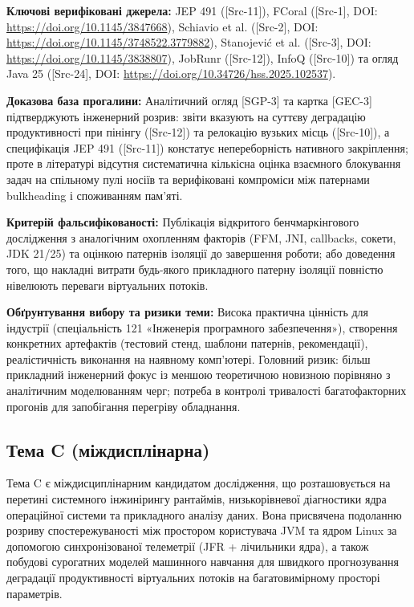 \textbf{Ключові верифіковані джерела:} JEP 491 ([Src-11]), FCoral ([Src-1], DOI: \url{https://doi.org/10.1145/3847668}), Schiavio et al. ([Src-2], DOI: \url{https://doi.org/10.1145/3748522.3779882}), Stanojević et al. ([Src-3], DOI: \url{https://doi.org/10.1145/3838807}), JobRunr ([Src-12]), InfoQ ([Src-10]) та огляд Java 25 ([Src-24], DOI: \url{https://doi.org/10.34726/hss.2025.102537}).

\textbf{Доказова база прогалини:} Аналітичний огляд [SGP-3] та картка [GEC-3] підтверджують інженерний розрив: звіти вказують на суттєву деградацію продуктивності при пінінгу ([Src-12]) та релокацію вузьких місць ([Src-10]), а специфікація JEP 491 ([Src-11]) констатує непереборність нативного закріплення; проте в літературі відсутня систематична кількісна оцінка взаємного блокування задач на спільному пулі носіїв та верифіковані компроміси між патернами bulkheading і споживанням пам'яті.

\textbf{Критерій фальсифікованості:} Публікація відкритого бенчмаркінгового дослідження з аналогічним охопленням факторів (FFM, JNI, callbacks, сокети, JDK 21/25) та оцінкою патернів ізоляції до завершення роботи; або доведення того, що накладні витрати будь-якого прикладного патерну ізоляції повністю нівелюють переваги віртуальних потоків.

\textbf{Обґрунтування вибору та ризики теми:} Висока практична цінність для індустрії (спеціальність 121 «Інженерія програмного забезпечення»), створення конкретних артефактів (тестовий стенд, шаблони патернів, рекомендації), реалістичність виконання на наявному комп'ютері. Головний ризик: більш прикладний інженерний фокус із меншою теоретичною новизною порівняно з аналітичним моделюванням черг; потреба в контролі тривалості багатофакторних прогонів для запобігання перегріву обладнання.

\subsection{Тема C (міждисплінарна)}

Тема C є міждисциплінарним кандидатом дослідження, що розташовується на перетині системного інжинірингу рантаймів, низькорівневої діагностики ядра операційної системи та прикладного аналізу даних. Вона присвячена подоланню розриву спостережуваності між простором користувача JVM та ядром Linux за допомогою синхронізованої телеметрії (JFR + лічильники ядра), а також побудові сурогатних моделей машинного навчання для швидкого прогнозування деградації продуктивності віртуальних потоків на багатовимірному просторі параметрів.

